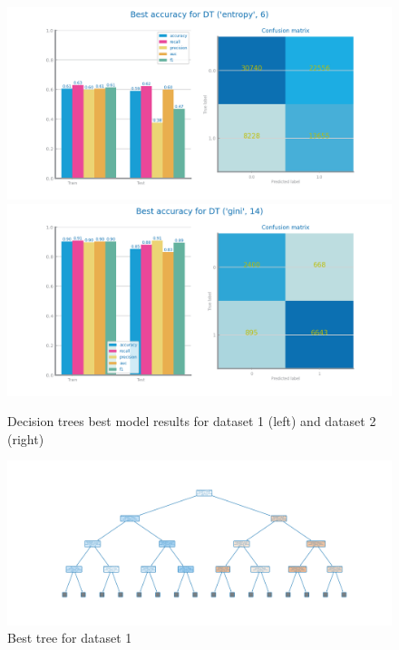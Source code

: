 \documentclass[10pt]{extarticle}
\begin{document}
\begin{figure}[H]
\centering\includegraphics[scale=0.95]{images/dataset1/models_evaluation/CovidPos_dt_DT_best_accuracy_eval.png}
\includegraphics[scale=0.95]{images/dataset2/models_evaluation/Credit_Score_DT_best_accuracy_eval.png}
\caption{Decision trees best model results for dataset 1 (left) and dataset 2 (right)}
\end{figure}

\begin{figure}[H]
\centering\includegraphics[scale=0.70]{images/dataset1/models_evaluation/CovidPos_dt_accuracy_best_tree.png}
\caption{Best tree for dataset 1}
\end{figure}
\end{document}
